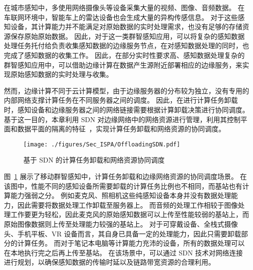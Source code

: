 
在城市感知中，多使用网络摄像头等设备采集大量的视频、图像、音频数据。
在车联网环境中，智能车上的雷达设备也会生成大量的异构传感信息。
对于这些感知设备，其计算能力并不能满足对原始数据的实时处理需求，也没有足够的存储资源保存原始原始数据。
因此，对于这一类群智感知应用，可以将复杂的感知数据处理任务托付给负责收集感知数据的边缘服务节点，在对感知数据处理的同时，也完成了感知数据的收集工作。
因此，在部分实时性要求高、感知数据处理复杂的群智感知应用中，可以借助边缘计算在数据产生源附近部署相应的边缘服务，来实现原始感知数据的实时处理与收集。

然而，边缘计算不同于云计算模型，由于边缘服务器的分布较为独立，没有专用的内部网络支撑计算任务在不同服务器之间的调度。
因此，在进行计算任务卸载时，感知设备和边缘服务器之间的网络链接需要根据计算卸载决策进行协同调度。
基于这一目的，本章利用 SDN 对边缘网络中的网络资源进行管理，利用其控制平面和数据平面的隔离的特征~\cite{Committee:2012un}，实现计算任务卸载和网络资源的协同调度。


\begin{figure}[!h]
  \centering
  \texttt{[image: ./figures/Sec\_ISPA/OffloadingSDN.pdf]}
  \vspace{-1em}
  \caption{基于 SDN 的计算任务卸载和网络资源协同调度}
  \vspace{-1em}
  \label{fig_OffloadingSDN}
\end{figure}

图~\ref{fig_OffloadingSDN} 展示了移动群智感知中，计算任务卸载和边缘网络资源的协同调度场景。
在该图中，性能不同的感知设备所需要卸载的计算任务比例也不相同，而基站也有计算能力强弱之分。
例如麦克风、照相机这些纯感知设备本身并没有数据处理能力，因此需要将数据处理工作卸载至服务器上。
而音频的处理工作相较于图像处理工作要更为轻松，因此麦克风的原始感知数据可以上传至性能较弱的基站上，而原始图像数据则上传至处理能力较强的基站上。
对于可穿戴设备、全栈式摄像头、手机平板、VR 设备而言，其自身已具备一定的处理能力，因此只需要卸载部分的计算任务。
而对于笔记本电脑等计算能力充沛的设备，所有的数据处理可以在本地执行完之后再上传至基站。
在该场景中，可以通过 SDN 技术对网络连接进行规划，以确保感知数据的传输时延以及链路带宽资源的合理利用。

